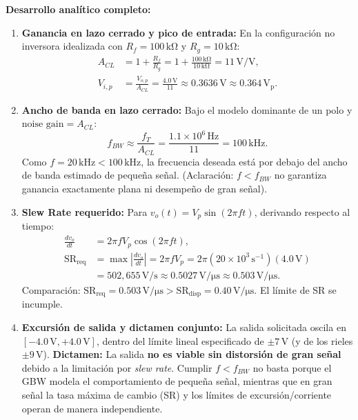 \documentclass[10pt, a4paper]{article}
\begin{document}
\textbf{Desarrollo analítico completo:}
\begin{enumerate}
    \renewcommand{\labelenumi}{(\alph{enumi})}
    \setlength{\itemsep}{3pt}
    \item \textbf{Ganancia en lazo cerrado y pico de entrada:} En la configuración no inversora idealizada con $R_f = 100\,\mathrm{k\Omega}$ y $R_g = 10\,\mathrm{k\Omega}$:
    \begin{align}
        A_{CL} &= 1 + \frac{R_f}{R_g} = 1 + \frac{100\,\mathrm{k\Omega}}{10\,\mathrm{k\Omega}} = 11\,\mathrm{V/V}, \\
        V_{i,p} &= \frac{V_{o,p}}{A_{CL}} = \frac{4.0\,\mathrm{V}}{11} \approx 0.3636\,\mathrm{V} \approx 0.364\,\mathrm{V_p}.
    \end{align}
    \item \textbf{Ancho de banda en lazo cerrado:} Bajo el modelo dominante de un polo y $\text{noise gain} = A_{CL}$:
    \begin{equation}
        f_{BW} \approx \frac{f_T}{A_{CL}} = \frac{1.1 \times 10^6\,\mathrm{Hz}}{11} = 100\,\mathrm{kHz}.
    \end{equation}
    Como $f = 20\,\mathrm{kHz} < 100\,\mathrm{kHz}$, la frecuencia deseada está por debajo del ancho de banda estimado de pequeña señal. (Aclaración: $f < f_{BW}$ no garantiza ganancia exactamente plana ni desempeño de gran señal).
    \item \textbf{Slew Rate requerido:} Para $v_o(t) = V_p \sin(2\pi f t)$, derivando respecto al tiempo:
    \begin{align}
        \frac{dv_o}{dt} &= 2\pi f V_p \cos(2\pi f t), \\
        \mathrm{SR}_{\mathrm{req}} &= \max\left|\frac{dv_o}{dt}\right| = 2\pi f V_p = 2\pi (20 \times 10^3\,\mathrm{s^{-1}})(4.0\,\mathrm{V}) \nonumber \\
        &= 502{,}655\,\mathrm{V/s} \approx 0.5027\,\mathrm{V/\mu s} \approx 0.503\,\mathrm{V/\mu s}.
    \end{align}
    Comparación: $\mathrm{SR}_{\mathrm{req}} = 0.503\,\mathrm{V/\mu s} > \mathrm{SR}_{\mathrm{disp}} = 0.40\,\mathrm{V/\mu s}$. El límite de SR se incumple.
    \item \textbf{Excursión de salida y dictamen conjunto:} La salida solicitada oscila en $[-4.0\,\mathrm{V}, +4.0\,\mathrm{V}]$, dentro del límite lineal especificado de $\pm 7\,\mathrm{V}$ (y de los rieles $\pm 9\,\mathrm{V}$). \textbf{Dictamen:} La salida \textbf{no es viable sin distorsión de gran señal} debido a la limitación por \textit{slew rate}. Cumplir $f < f_{BW}$ no basta porque el GBW modela el comportamiento de pequeña señal, mientras que en gran señal la tasa máxima de cambio (SR) y los límites de excursión/corriente operan de manera independiente.

\end{enumerate}
\end{document}
